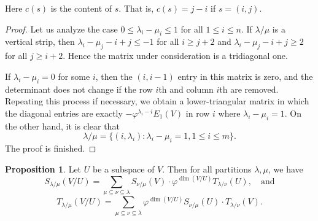 \documentclass[12pt,a4paper]{report}
\theoremstyle{definition}
\newtheorem{proposition}[theorem]{Proposition}
\theoremstyle{remark}
\theoremstyle{definition}
\begin{document}
Here $c(s)$ is the content of $s$. That is, $c(s) = j-i$ if $s = (i,j)$. 
\begin{proof}
 Let us analyze the case $0 \leq \lambda_i - \mu_i \leq 1$ for all $1 \leq i \leq n$. If $\lambda/\mu$ is a vertical strip, then  $\lambda_i -\mu_j -i + j \leq -1$ for all $i \geq j+2$ and $\lambda_i -\mu_j -i + j \geq 2$ for all $j \geq i+2$. Hence the matrix under consideration is a tridiagonal one.  
 
If $\lambda_i - \mu_i = 0$ for some $i$, then the $(i,i-1)$ entry in this matrix is zero, and the determinant does not change if the row $i$th and column $i$th are removed. Repeating this process if necessary, we obtain a lower-triangular matrix in which the diagonal entries are exactly $- \varphi^{\lambda_i - i} E_1(V)$ in row $i$ where $\lambda_i - \mu_i = 1$. On the other hand, it is clear that 
\begin{equation*}
\lambda/\mu = \{(i, \lambda_i) \colon \lambda_i - \mu_i = 1, 1 \leq i \leq m\}. 
\end{equation*}
 The proof is finished.   
\end{proof}
\begin{proposition}\label{new_decompose}
Let $U$ be a subspace of $V$. Then for all partitions $\lambda, \mu$, we have 
\begin{equation}\label{eq: SST}
    S_{\lambda/\mu}(V/U) = \sum\limits_{\mu \subseteq \nu\subseteq \lambda} S_{\nu/\mu}(V)\cdot \varphi^{\dim(V/U)}T_{\lambda/\nu}(U), \quad \text{and}  
\end{equation}
\begin{equation}\label{eq: TST}
    T_{\lambda/\mu}(V/U) = \sum\limits_{\mu \subseteq \nu\subseteq \lambda} \varphi^{\dim(V/U)} S_{\nu/
    \mu}(U) \cdot T_{\lambda/\nu}(V). 
\end{equation}
\end{proposition}
\end{document}
